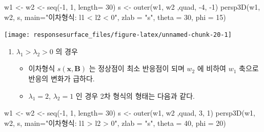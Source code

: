 \documentclass[
]{book}
\newenvironment{Shaded}{\begin{snugshade}}{\end{snugshade}}
\newcommand{\AttributeTok}[1]{\textcolor[rgb]{0.77,0.63,0.00}{#1}}
\newcommand{\DecValTok}[1]{\textcolor[rgb]{0.00,0.00,0.81}{#1}}
\newcommand{\FunctionTok}[1]{\textcolor[rgb]{0.00,0.00,0.00}{#1}}
\newcommand{\NormalTok}[1]{#1}
\newcommand{\OtherTok}[1]{\textcolor[rgb]{0.56,0.35,0.01}{#1}}
\newcommand{\SpecialCharTok}[1]{\textcolor[rgb]{0.00,0.00,0.00}{#1}}
\newcommand{\StringTok}[1]{\textcolor[rgb]{0.31,0.60,0.02}{#1}}
\newcommand{\bm}[1]{\boldsymbol{\mathbf{#1}}}
\theoremstyle{definition}
\theoremstyle{definition}
\theoremstyle{definition}
\theoremstyle{definition}
\theoremstyle{remark}
\begin{document}
\begin{Shaded}
\begin{Highlighting}[]
\NormalTok{w1 }\OtherTok{\textless{}{-}}\NormalTok{ w2 }\OtherTok{\textless{}{-}} \FunctionTok{seq}\NormalTok{(}\SpecialCharTok{{-}}\DecValTok{1}\NormalTok{, }\DecValTok{1}\NormalTok{, }\AttributeTok{length=} \DecValTok{30}\NormalTok{)}
\NormalTok{s }\OtherTok{\textless{}{-}} \FunctionTok{outer}\NormalTok{(w1, w2 ,quad, }\SpecialCharTok{{-}}\DecValTok{4}\NormalTok{, }\SpecialCharTok{{-}}\DecValTok{1}\NormalTok{)}
\FunctionTok{persp3D}\NormalTok{(w1, w2, s,}
      \AttributeTok{main=}\StringTok{"이차형식: l1 \textless{} l2 \textless{} 0"}\NormalTok{,}
      \AttributeTok{zlab =} \StringTok{"s"}\NormalTok{,}
      \AttributeTok{theta =} \DecValTok{30}\NormalTok{, }\AttributeTok{phi =} \DecValTok{15}\NormalTok{)}
\end{Highlighting}
\end{Shaded}

\begin{center}\texttt{[image: responsesurface\_files/figure-latex/unnamed-chunk-20-1]} \end{center}

\begin{enumerate}
\def\labelenumi{\arabic{enumi}.}
\setcounter{enumi}{1}
\item
  \(\lambda_1 > \lambda_2 > 0\) 의 경우

  \begin{itemize}
  \item
    이차형식 \(s(\bm x, \bm B)\) 는 정상점이 최소 반응점이 되며 \(w_2\) 에 비하여 \(w_1\) 축으로 반응의 변화가 급하다.
  \item
    \(\lambda_1 =2\), \(\lambda_2 =1\) 인 경우 2차 형식의 형태는 다음과 같다.
  \end{itemize}
\end{enumerate}

\begin{Shaded}
\begin{Highlighting}[]
\NormalTok{w1 }\OtherTok{\textless{}{-}}\NormalTok{ w2 }\OtherTok{\textless{}{-}} \FunctionTok{seq}\NormalTok{(}\SpecialCharTok{{-}}\DecValTok{1}\NormalTok{, }\DecValTok{1}\NormalTok{, }\AttributeTok{length=} \DecValTok{30}\NormalTok{)}
\NormalTok{s }\OtherTok{\textless{}{-}} \FunctionTok{outer}\NormalTok{(w1, w2 ,quad, }\DecValTok{3}\NormalTok{, }\DecValTok{1}\NormalTok{)}
\FunctionTok{persp3D}\NormalTok{(w1, w2, s,}
      \AttributeTok{main=}\StringTok{"이차형식: l1 \textgreater{} l2 \textgreater{}  0"}\NormalTok{,}
      \AttributeTok{zlab =} \StringTok{"s"}\NormalTok{,}
      \AttributeTok{theta =} \DecValTok{40}\NormalTok{, }\AttributeTok{phi =} \DecValTok{20}\NormalTok{)}
\end{Highlighting}
\end{Shaded}
\end{document}
